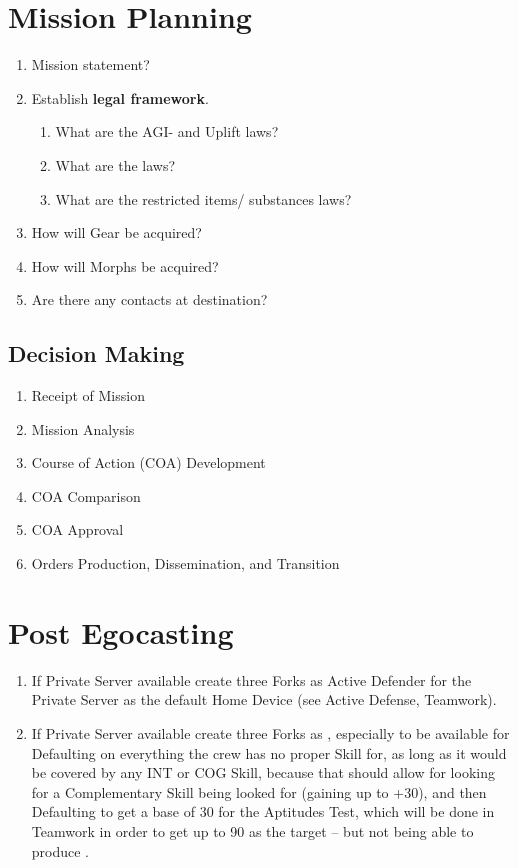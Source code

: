
\section{Mission Planning}

\begin{enumerate}
    \item Mission statement?
    \item Establish \textbf{legal framework}. 
    \begin{enumerate}
        \item What are the AGI- and Uplift laws?
        \item What are the  laws?
        \item What are the restricted items/ substances laws?
    \end{enumerate}
    \item How will Gear be acquired?
    \item How will Morphs be acquired?
    \item Are there any contacts at destination?
\end{enumerate}


\subsection{Decision Making}

\begin{enumerate}
    \item Receipt of Mission
    \item Mission Analysis
    \item Course of Action (COA) Development
    \item COA Comparison
    \item COA Approval
    \item Orders Production, Dissemination, and Transition
\end{enumerate}


\section{Post Egocasting}

\begin{enumerate}
    \item If \gls{Private Server} available create three \glspl{Fork} as \gls{Active Defender} for the \gls{Private Server} as the default \gls{Home Device} (see \gls{Active Defense}, \gls{Teamwork}).
    \item If \gls{Private Server} available create three \glspl{Fork} as , especially to be available for \gls{Defaulting} on everything the crew has no proper Skill for, as long as it would be covered by any INT or COG Skill, because that should allow for looking for a \gls{Complementary Skill} being looked for (gaining up to +30), and then \gls{Defaulting} to get a base of 30 for the Aptitudes Test, which will be done in \gls{Teamwork} in order to get up to 90 as the target -- but not being able to produce .
\end{enumerate}

